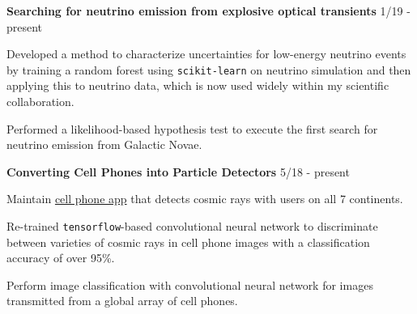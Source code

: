 \begin{cventries}
{    }
\vspace{-0.1cm}   
\cventry
    {\hspace{0.25in}\textbf{Searching for neutrino emission from explosive optical transients}}
    {}
    {}
    {1/19 - present}
    {
    \begin{nestcvitems}
      \vspace{-0.1cm}
      \item {Developed a method to characterize uncertainties for low-energy neutrino events by training a random forest using \texttt{scikit-learn} on neutrino simulation and then applying this to neutrino data, which is now used widely within my scientific collaboration.}
      \item {Performed a likelihood-based hypothesis test to execute the first search for neutrino emission from Galactic Novae.}
    \end{nestcvitems}
    }
\vspace{-0.1cm}
  \cventry
    {\hspace{0.25in}\textbf{Converting Cell Phones into Particle Detectors}}
    {}
    {}
    {5/18 - present}
    {
    \begin{nestcvitems}
      \vspace{-0.1cm}
      \item {Maintain \href{https://wipac.wisc.edu/deco/home}{cell phone app} that detects cosmic rays with users on all 7 continents.}
      \item {Re-trained \texttt{tensorflow}-based convolutional neural network to discriminate between varieties of cosmic rays in cell phone images with a classification accuracy of over 95\%.}
      \item {Perform image classification with convolutional neural network for images transmitted from a global array of cell phones.}
    \end{nestcvitems}
    }
    
\end{cventries}

